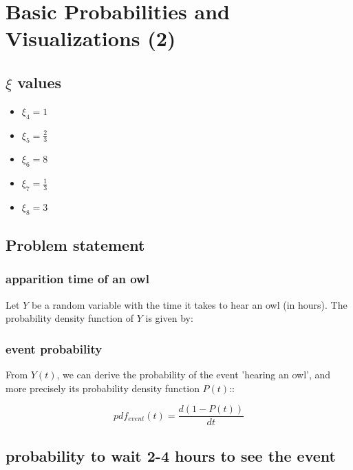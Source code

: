 \chapter{Basic Probabilities and Visualizations (2)}

\section{$\xi$ values}

\begin{itemize}
    \item $\xi_4 = 1$
    \item $\xi_5 = \frac{2}{3}$
    \item $\xi_6 = 8$
    \item $\xi_7 = \frac{1}{3}$
    \item $\xi_8 = 3$
\end{itemize}

\section{Problem statement}
\subsection*{apparition time of an owl}
Let $Y$ be a random variable with the time it takes to hear an owl (in hours).
The probability density function of $Y$ is given by:


\subsection*{event probability}

From $Y(t)$, we can derive the probability of the event 'hearing an owl', and more precisely its probability density function $P(t)$::

\begin{equation}
    pdf_{event}(t) = \frac{d(1-P(t))}{dt}
\end{equation}

\section{probability to wait 2-4 hours to see the event}

